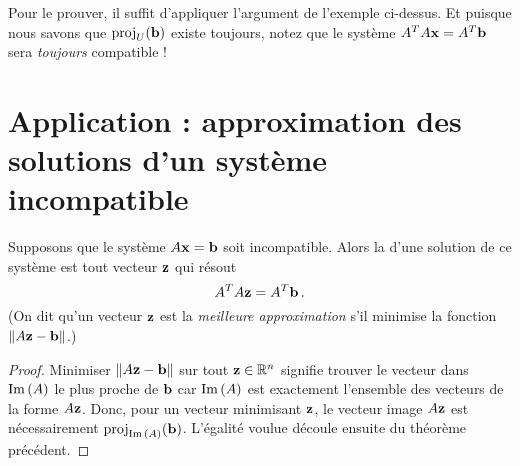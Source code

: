 Pour le prouver, il suffit d'appliquer l'argument de l'exemple ci-dessus.
Et puisque nous savons que $\operatorname{proj}_U(\mathbf{b})$ existe toujours, notez que le système  
$A^TA \mathbf{x} = A^T \mathbf{b}$ sera {\it toujours} compatible !

\section{Application : approximation des solutions d'un système incompatible}

\begin{corollary}
Supposons que le système $A\mathbf{x} = \mathbf{b}$ soit incompatible.  Alors la
 d'une solution de ce système est
tout vecteur $\mathbf{z}$ qui résout
$$
A^TA \mathbf{z} = A^T \mathbf{b}\,.
$$
(On dit qu'un vecteur $\mathbf{z}$ est la \emph{meilleure approximation} s'il minimise la fonction $\Vert A\mathbf{z} - \mathbf{b} \Vert$.)
\end{corollary}

\begin{proof}
Minimiser $\Vert A\mathbf{z} - \mathbf{b} \Vert$ sur tout $\mathbf{z} \in \mathbb{R}^n$ 
signifie trouver le vecteur dans $\operatorname{Im}\,(A)$ le plus proche de $\mathbf{b}$ car $\operatorname{Im}\,(A)$ est exactement l'ensemble des vecteurs de la forme $A\mathbf{z}$.
Donc, pour un vecteur minimisant $\mathbf{z}$, le vecteur image $A\mathbf{z}$ est nécessairement $\operatorname{proj}_{\operatorname{Im}\,(A)}(\mathbf{b})$. L'égalité voulue découle ensuite du théorème précédent.
\end{proof}

